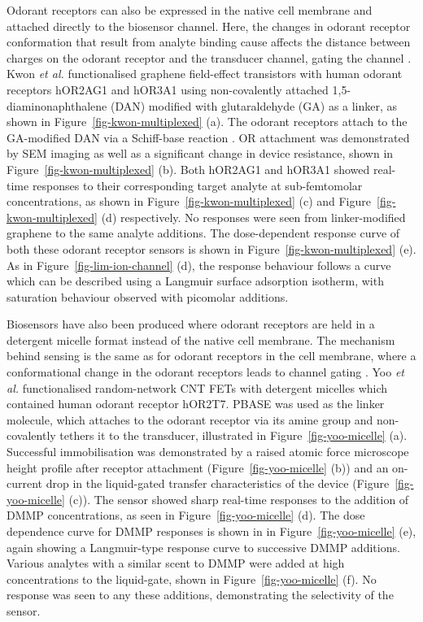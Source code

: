 \documentclass[
  a4paper,
]{scrbook}
\begin{document}
Odorant receptors can also be expressed in the native cell membrane and
attached directly to the biosensor channel. Here, the changes in odorant
receptor conformation that result from analyte binding cause affects the
distance between charges on the odorant receptor and the transducer
channel, gating the channel \autocite{Kwon2015,Dung2018}. Kwon \emph{et
al.} functionalised graphene field-effect transistors with human odorant
receptors hOR2AG1 and hOR3A1 using non-covalently attached
1,5-diaminonaphthalene (DAN) modified with glutaraldehyde (GA) as a
linker, as shown in Figure~\ref{fig-kwon-multiplexed} (a). The odorant
receptors attach to the GA-modified DAN via a Schiff-base reaction
\autocite{Bhatt2021}. OR attachment was demonstrated by SEM imaging as
well as a significant change in device resistance, shown in
Figure~\ref{fig-kwon-multiplexed} (b). Both hOR2AG1 and hOR3A1 showed
real-time responses to their corresponding target analyte at
sub-femtomolar concentrations, as shown in
Figure~\ref{fig-kwon-multiplexed} (c) and
Figure~\ref{fig-kwon-multiplexed} (d) respectively. No responses were
seen from linker-modified graphene to the same analyte additions. The
dose-dependent response curve of both these odorant receptor sensors is
shown in Figure~\ref{fig-kwon-multiplexed} (e). As in
Figure~\ref{fig-lim-ion-channel} (d), the response behaviour follows a
curve which can be described using a Langmuir surface adsorption
isotherm, with saturation behaviour observed with picomolar additions.

Biosensors have also been produced where odorant receptors are held in a
detergent micelle format instead of the native cell membrane. The
mechanism behind sensing is the same as for odorant receptors in the
cell membrane, where a conformational change in the odorant receptors
leads to channel gating \autocite{Dung2018,Yoo2022}. Yoo \emph{et al.}
functionalised random-network CNT FETs with detergent micelles which
contained human odorant receptor hOR2T7. PBASE was used as the linker
molecule, which attaches to the odorant receptor via its amine group and
non-covalently tethers it to the transducer, illustrated in
Figure~\ref{fig-yoo-micelle} (a). Successful immobilisation was
demonstrated by a raised atomic force microscope height profile after
receptor attachment (Figure~\ref{fig-yoo-micelle} (b)) and an on-current
drop in the liquid-gated transfer characteristics of the device
(Figure~\ref{fig-yoo-micelle} (c)). The sensor showed sharp real-time
responses to the addition of DMMP concentrations, as seen in
Figure~\ref{fig-yoo-micelle} (d). The dose dependence curve for DMMP
responses is shown in in Figure~\ref{fig-yoo-micelle} (e), again showing
a Langmuir-type response curve to successive DMMP additions. Various
analytes with a similar scent to DMMP were added at high concentrations
to the liquid-gate, shown in Figure~\ref{fig-yoo-micelle} (f). No
response was seen to any these additions, demonstrating the selectivity
of the sensor.
\end{document}
